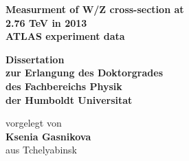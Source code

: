 
\begin{titlepage}
  \begin{center}
    \thispagestyle{empty}
    \vspace*{1cm}
    \begin{doublespace} 

      \textbf{\huge Measurment of W/Z cross-section at}\\
      \textbf{\huge 2.76 TeV in 2013}\\
      \textbf{\huge ATLAS experiment data}\\
      \vskip1.5cm
      \begin{Large} 
        \textbf{Dissertation\\
          zur Erlangung des Doktorgrades\\
          des Fachbereichs Physik\\
          der Humboldt Universitat\\}
      \end{Large}
      \vskip2cm
      \begin{large}
        vorgelegt von\\
        \textbf{Ksenia Gasnikova}\\
        aus Tchelyabinsk
        \vfill
      \end{large}
    \end{doublespace} 
  \end{center}
\end{titlepage}






